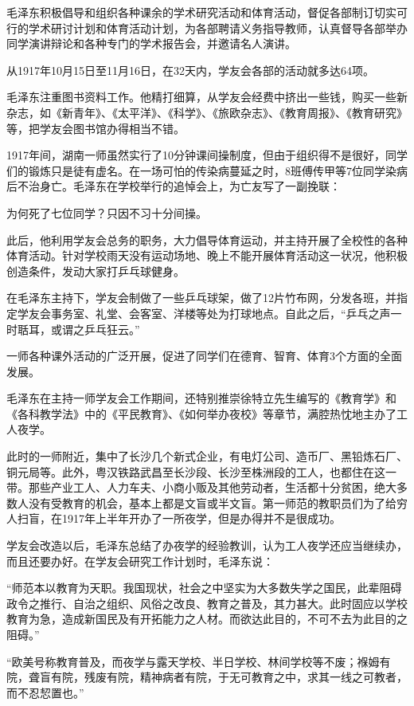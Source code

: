 \documentclass[../../dazhuan.tex]{subfiles}
\begin{document}
毛泽东积极倡导和组织各种课余的学术研究活动和体育活动，督促各部制订切实可行的学术研讨计划和体育活动计划，为各部聘请义务指导教师，认真督导各部举办同学演讲辩论和各种专门的学术报告会，并邀请名人演讲。

从1917年10月15日至11月16日，在32天内，学友会各部的活动就多达64项。

毛泽东注重图书资料工作。他精打细算，从学友会经费中挤出一些钱，购买一些新杂志，如《新青年》、《太平洋》、《科学》、《旅欧杂志》、《教育周报》、《教育研究》等，把学友会图书馆办得相当不错。

1917年间，湖南一师虽然实行了10分钟课间操制度，但由于组织得不是很好，同学们的锻炼只是徒有虚名。在一场可怕的传染病蔓延之时，8班傅传甲等7位同学染病后不治身亡。毛泽东在学校举行的追悼会上，为亡友写了一副挽联：

为何死了七位同学？只因不习十分间操。

此后，他利用学友会总务的职务，大力倡导体育运动，并主持开展了全校性的各种体育活动。针对学校雨天没有运动场地、晚上不能开展体育活动这一状况，他积极创造条件，发动大家打乒乓球健身。

在毛泽东主持下，学友会制做了一些乒乓球架，做了12片竹布网，分发各班，并指定学友会事务室、礼堂、会客室、洋楼等处为打球地点。自此之后，“乒乓之声一时聒耳，或谓之乒乓狂云。”

一师各种课外活动的广泛开展，促进了同学们在德育、智育、体育3个方面的全面发展。

毛泽东在主持一师学友会工作期间，还特别推崇徐特立先生编写的《教育学》和《各科教学法》中的《平民教育》、《如何举办夜校》等章节，满腔热忱地主办了工人夜学。

此时的一师附近，集中了长沙几个新式企业，有电灯公司、造币厂、黑铅炼石厂、铜元局等。此外，粤汉铁路武昌至长沙段、长沙至株洲段的工人，也都住在这一带。那些产业工人、人力车夫、小商小贩及其他劳动者，生活都十分贫困，绝大多数人没有受教育的机会，基本上都是文盲或半文盲。第一师范的教职员们为了给穷人扫盲，在1917年上半年开办了一所夜学，但是办得并不是很成功。

学友会改造以后，毛泽东总结了办夜学的经验教训，认为工人夜学还应当继续办，而且还要办好。在学友会研究工作计划时，毛泽东说：

“师范本以教育为天职。我国现状，社会之中坚实为大多数失学之国民，此辈阻碍政令之推行、自治之组织、风俗之改良、教育之普及，其力甚大。此时固应以学校教育为急，造成新国民及有开拓能力之人材。而欲达此目的，不可不去为此目的之阻碍。”

“欧美号称教育普及，而夜学与露天学校、半日学校、林间学校等不废；褓姆有院，聋盲有院，残废有院，精神病者有院，于无可教育之中，求其一线之可教者，而不忍恝置也。”
\end{document}
